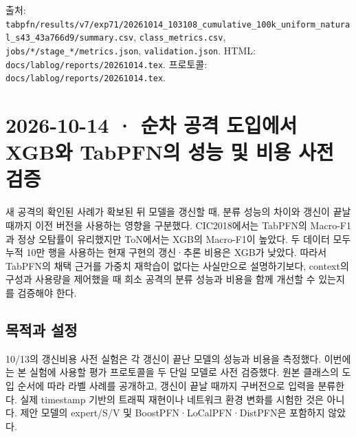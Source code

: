 출처: \texttt{tabpfn/\allowbreak{}\allowbreak{}r\allowbreak{}esults/\allowbreak{}\allowbreak{}v\allowbreak{}7/\allowbreak{}\allowbreak{}exp71/\allowbreak{}\allowbreak{}20261014\allowbreak{}\_\allowbreak{}\allowbreak{}103108\_\allowbreak{}\allowbreak{}cumulati\allowbreak{}ve\_\allowbreak{}\allowbreak{}100k\_\allowbreak{}\allowbreak{}uniform\_\allowbreak{}\allowbreak{}natural\_\allowbreak{}\allowbreak{}s43\_\allowbreak{}\allowbreak{}43a7\allowbreak{}66d9/\allowbreak{}\allowbreak{}sum\allowbreak{}mary.\allowbreak{}csv\allowbreak{}}, \texttt{class\_\allowbreak{}\allowbreak{}me\allowbreak{}trics.\allowbreak{}cs\allowbreak{}v}, \texttt{jobs/\allowbreak{}\allowbreak{}*/\allowbreak{}\allowbreak{}s\allowbreak{}tage\_\allowbreak{}\allowbreak{}*/\allowbreak{}\allowbreak{}m\allowbreak{}etrics.\allowbreak{}j\allowbreak{}son}, \texttt{validati\allowbreak{}on.\allowbreak{}json}. HTML: \texttt{docs/\allowbreak{}\allowbreak{}lab\allowbreak{}log/\allowbreak{}\allowbreak{}repo\allowbreak{}rts/\allowbreak{}\allowbreak{}2026\allowbreak{}1014.\allowbreak{}tex\allowbreak{}}. 프로토콜: \texttt{docs/\allowbreak{}\allowbreak{}lab\allowbreak{}log/\allowbreak{}\allowbreak{}repo\allowbreak{}rts/\allowbreak{}\allowbreak{}2026\allowbreak{}1014.\allowbreak{}tex\allowbreak{}}.



\section{2026-10-14 · 순차 공격 도입에서 XGB와 TabPFN의 성능 및 비용 사전 검증}
\label{report:20261014_exp72_results}
새 공격의 확인된 사례가 확보된 뒤 모델을 갱신할 때, 분류 성능의 차이와 갱신이 끝날 때까지 이전 버전을 사용하는 영향을 구분했다. CIC2018에서는 TabPFN의 Macro-F1과 정상 오탐률이 유리했지만 ToN에서는 XGB의 Macro-F1이 높았다. 두 데이터 모두 누적 10만 행을 사용하는 현재 구현의 갱신·추론 비용은 XGB가 낮았다. 따라서 TabPFN의 채택 근거를 가중치 재학습이 없다는 사실만으로 설명하기보다, context의 구성과 사용량을 제어했을 때 희소 공격의 분류 성능과 비용을 함께 개선할 수 있는지를 검증해야 한다.

\subsection{목적과 설정}
10/\allowbreak{}13의 갱신비용 사전 실험은 각 갱신이 끝난 모델의 성능과 비용을 측정했다. 이번에는 본 실험에 사용할 평가 프로토콜을 두 단일 모델로 사전 검증했다. 원본 클래스의 도입 순서에 따라 라벨 사례를 공개하고, 갱신이 끝날 때까지 구버전으로 입력을 분류한다. 실제 timestamp 기반의 트래픽 재현이나 네트워크 환경 변화를 시험한 것은 아니다. 제안 모델의 expert/\allowbreak{}S/\allowbreak{}V 및 BoostPFN·LoCalPFN·DistPFN은 포함하지 않았다.

